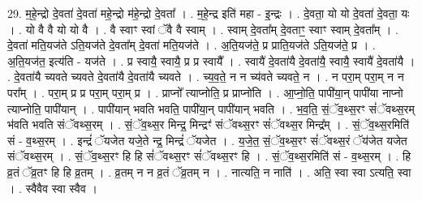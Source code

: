 \documentclass[17pt]{extarticle}
\begin{document}
29. म॒हे॒न्द्रो दे॒वता॑ दे॒वता॑ महे॒न्द्रो म॑हे॒न्द्रो दे॒वता᳚ । . म॒हे॒न्द्र इति॑ महा - इ॒न्द्रः । . दे॒वता॒ यो यो दे॒वता॑ दे॒वता॒ यः । . यो वै वै यो यो वै । . वै स्वाꣳ स्वां ॅवै वै स्वाम् । . स्वाम् दे॒वता᳚म् दे॒वताꣳ॒॒ स्वाꣳ स्वाम् दे॒वता᳚म् । . दे॒वता॑ मति॒यज॑ते ऽति॒यज॑ते दे॒वता᳚म् दे॒वता॑ मति॒यज॑ते । . अ॒ति॒यज॑ते॒ प्र प्राति॒यज॑ते ऽति॒यज॑ते॒ प्र । . अ॒ति॒यज॑त॒ इत्य॑ति - यज॑ते । . प्र स्वायै॒ स्वायै॒ प्र प्र स्वायै᳚ । . स्वायै॑ दे॒वता॑यै दे॒वता॑यै॒ स्वायै॒ स्वायै॑ दे॒वता॑यै । . दे॒वता॑यै च्यवते च्यवते दे॒वता॑यै दे॒वता॑यै च्यवते । . च्य॒व॒ते॒ न न च्य॑वते च्यवते॒ न । . न परा॒म् परा॒म् न न परा᳚म् । . परा॒म् प्र प्र परा॒म् परा॒म् प्र । . प्राप्नो᳚ त्याप्नोति॒ प्र प्राप्नो॑ति । . आ॒प्नो॒ति॒ पापी॑या॒न् पापी॑या नाप्नो त्याप्नोति॒ पापी॑यान् । . पापी॑यान् भवति भवति॒ पापी॑या॒न् पापी॑यान् भवति । . भ॒व॒ति॒ सं॒ॅव॒थ्स॒रꣳ सं॑ॅवथ्स॒रम् भ॑वति भवति संॅवथ्स॒रम् । . सं॒ॅव॒थ्स॒र मिन्द्र॒ मिन्द्रꣳ॑ संॅवथ्स॒रꣳ सं॑ॅवथ्स॒र मिन्द्र᳚म् । . सं॒ॅव॒थ्स॒रमिति॑ सं - व॒थ्स॒रम् । . इन्द्रं॑ ॅयजेत यजे॒ते न्द्र॒ मिन्द्रं॑ ॅयजेत । . य॒जे॒त॒ सं॒ॅव॒थ्स॒रꣳ सं॑ॅवथ्स॒रं ॅय॑जेत यजेत संॅवथ्स॒रम् । . सं॒ॅव॒थ्स॒रꣳ हि हि सं॑ॅवथ्स॒रꣳ सं॑ॅवथ्स॒रꣳ हि । . सं॒ॅव॒थ्स॒रमिति॑ सं - व॒थ्स॒रम् । . हि व्र॒तं ॅव्र॒तꣳ हि हि व्र॒तम् । . व्र॒तम् न न व्र॒तं ॅव्र॒तम् न । . नात्यति॒ न नाति॑ । . अति॒ स्वा स्वा ऽत्यति॒ स्वा । . स्वैवैव स्वा स्वैव । \newline
\end{document}
